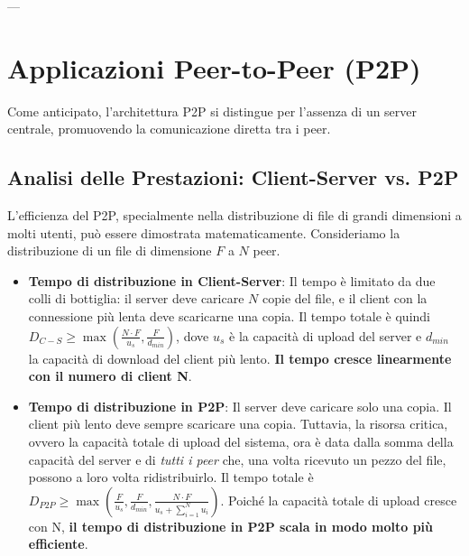 ---

\section{Applicazioni Peer-to-Peer (P2P)}
Come anticipato, l'architettura P2P si distingue per l'assenza di un server centrale, promuovendo la comunicazione diretta tra i peer.

\subsection{Analisi delle Prestazioni: Client-Server vs. P2P}
L'efficienza del P2P, specialmente nella distribuzione di file di grandi dimensioni a molti utenti, può essere dimostrata matematicamente. Consideriamo la distribuzione di un file di dimensione $F$ a $N$ peer.
\begin{itemize}
    \item \textbf{Tempo di distribuzione in Client-Server}: Il tempo è limitato da due colli di bottiglia: il server deve caricare $N$ copie del file, e il client con la connessione più lenta deve scaricarne una copia. Il tempo totale è quindi $D_{C-S} \ge \max(\frac{N \cdot F}{u_s}, \frac{F}{d_{min}})$, dove $u_s$ è la capacità di upload del server e $d_{min}$ la capacità di download del client più lento. \textbf{Il tempo cresce linearmente con il numero di client N}.
    \item \textbf{Tempo di distribuzione in P2P}: Il server deve caricare solo una copia. Il client più lento deve sempre scaricare una copia. Tuttavia, la risorsa critica, ovvero la capacità totale di upload del sistema, ora è data dalla somma della capacità del server e di \textit{tutti i peer} che, una volta ricevuto un pezzo del file, possono a loro volta ridistribuirlo. Il tempo totale è $D_{P2P} \ge \max(\frac{F}{u_s}, \frac{F}{d_{min}}, \frac{N \cdot F}{u_s + \sum_{i=1}^{N} u_i})$. Poiché la capacità totale di upload cresce con N, \textbf{il tempo di distribuzione in P2P scala in modo molto più efficiente}.
\end{itemize}

